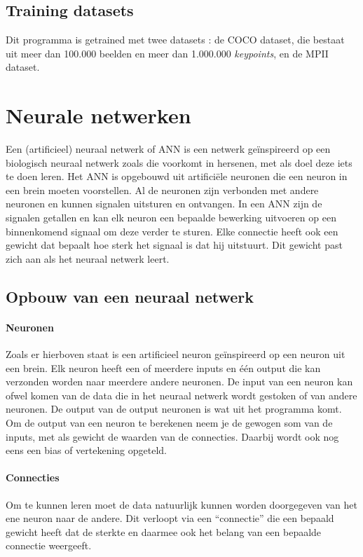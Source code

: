 \documentclass[a4paper,twoside,kulak]{kulakreport}
\begin{document}
\subsection{Training datasets}
Dit programma is getrained met twee datasets \cite{openpose}: de COCO dataset, die bestaat uit meer dan 100.000 beelden en meer dan 1.000.000 \emph{keypoints}, en de MPII dataset.
\section{Neurale netwerken}

Een (artificieel) neuraal netwerk of ANN is een netwerk geïnspireerd op een biologisch neuraal netwerk zoals die voorkomt in hersenen, met als doel deze iets te doen leren. Het ANN is opgebouwd uit artificiële neuronen die een neuron in een brein moeten voorstellen. Al de neuronen zijn verbonden met andere neuronen en kunnen signalen uitsturen en ontvangen. In een ANN zijn de signalen getallen en kan elk neuron een bepaalde bewerking uitvoeren op een binnenkomend signaal om deze verder te sturen. Elke connectie heeft ook een gewicht dat bepaalt hoe sterk het signaal is dat hij uitstuurt. Dit gewicht past zich aan als het neuraal netwerk leert. 

\subsection{Opbouw van een neuraal netwerk}
\paragraph{Neuronen}
Zoals er hierboven staat is een artificieel neuron geïnspireerd op een neuron uit een brein. Elk neuron heeft een of meerdere inputs en één output die kan verzonden worden naar meerdere andere neuronen. De input van een neuron kan ofwel komen van de data die in het neuraal netwerk wordt gestoken of van andere neuronen. De output van de output neuronen is wat uit het programma komt. Om de output van een neuron te berekenen neem je de gewogen som van de inputs, met als gewicht de waarden van de connecties. Daarbij wordt ook nog eens een bias of vertekening opgeteld.

\paragraph{Connecties}
Om te kunnen leren moet de data natuurlijk kunnen worden doorgegeven van het ene neuron naar de andere. Dit verloopt via een “connectie” die een bepaald gewicht heeft dat de sterkte en daarmee ook het belang van een bepaalde connectie weergeeft.
\end{document}
